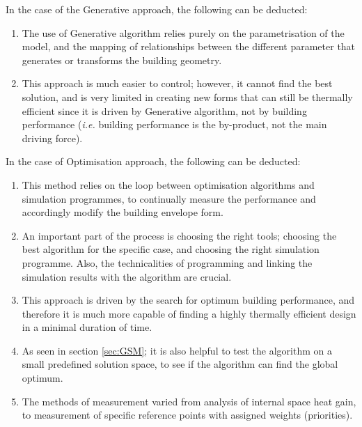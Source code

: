 In the case of the Generative approach, the following can be deducted:
\begin{enumerate}
	\item The use of Generative algorithm relies purely on the parametrisation of the model, and the mapping of relationships between the different parameter that generates or transforms the building geometry.
	\item This approach is much easier to control; however, it cannot find the best solution, and is very limited in creating new forms that can still be thermally efficient since it is driven by Generative algorithm, not by building performance (\emph{i.e.} building performance is the by-product, not the main driving force).
\end{enumerate}

In the case of Optimisation approach, the following can be deducted:
\begin{enumerate}
	\item This method relies on the loop between optimisation algorithms and simulation programmes, to continually measure the performance and accordingly modify the building envelope form.
	\item An important part of the process is choosing the right tools; choosing the best algorithm for the specific case, and choosing the right simulation programme. Also, the technicalities of programming and linking the simulation results with the algorithm are crucial.
	\item This approach is driven by the search for optimum building performance, and therefore it is much more capable of finding a highly thermally efficient design in a minimal duration of time.
	\item As seen in section \ref{sec:GSM}; it is also helpful to test the algorithm on a small predefined solution space, to see if the algorithm can find the global optimum.
	\item The methods of measurement varied from analysis of internal space heat gain, to measurement of specific reference points with assigned weights (priorities).
\end{enumerate}
